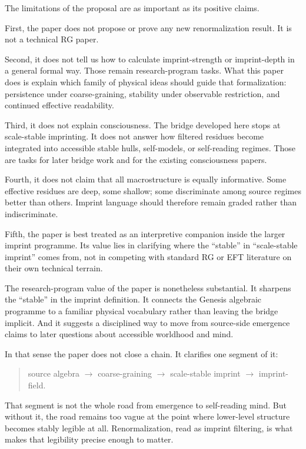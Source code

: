 \documentclass[12pt,a4paper]{article}
\begin{document}
The limitations of the proposal are as important as its positive claims.

First, the paper does not propose or prove any new renormalization result. It is not a technical RG paper.

Second, it does not tell us how to calculate imprint-strength or imprint-depth in a general formal way. Those remain research-program tasks. What this paper does is explain which family of physical ideas should guide that formalization: persistence under coarse-graining, stability under observable restriction, and continued effective readability.

Third, it does not explain consciousness. The bridge developed here stops at scale-stable imprinting. It does not answer how filtered residues become integrated into accessible stable hulls, self-models, or self-reading regimes. Those are tasks for later bridge work and for the existing consciousness papers.

Fourth, it does not claim that all macrostructure is equally informative. Some effective residues are deep, some shallow; some discriminate among source regimes better than others. Imprint language should therefore remain graded rather than indiscriminate.

Fifth, the paper is best treated as an interpretive companion inside the larger imprint programme. Its value lies in clarifying where the ``stable'' in ``scale-stable imprint'' comes from, not in competing with standard RG or EFT literature on their own technical terrain.

The research-program value of the paper is nonetheless substantial. It sharpens the ``stable'' in the imprint definition. It connects the Genesis algebraic programme to a familiar physical vocabulary rather than leaving the bridge implicit. And it suggests a disciplined way to move from source-side emergence claims to later questions about accessible worldhood and mind.

In that sense the paper does not close a chain. It clarifies one segment of it:

\begin{quote}
source algebra $\to$ coarse-graining $\to$ scale-stable imprint $\to$ imprint-field.
\end{quote}

That segment is not the whole road from emergence to self-reading mind. But without it, the road remains too vague at the point where lower-level structure becomes stably legible at all. Renormalization, read as imprint filtering, is what makes that legibility precise enough to matter.
\end{document}
